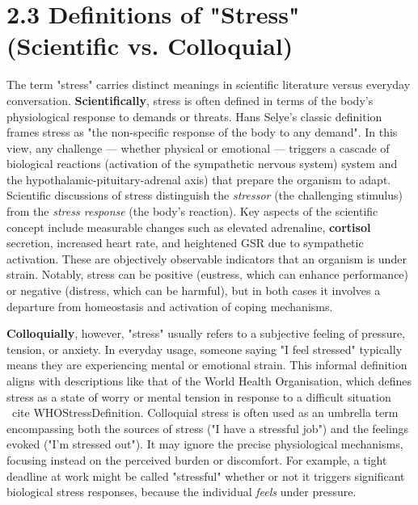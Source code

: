 \documentclass[11pt,a4paper]{report}
\begin{document}
\section{2.3 Definitions of "Stress" (Scientific vs. Colloquial)}

The term "stress" carries distinct meanings in scientific literature
versus everyday conversation. \textbf{Scientifically}, stress is often
defined in terms of the body's physiological response to demands or
threats. Hans Selye's classic definition frames stress as "the
non-specific response of the body to any
demand"\cite{StressDefinitionHH}.
In this view, any challenge --- whether physical or emotional --- triggers
a cascade of biological reactions (activation of the sympathetic nervous system)
system and the hypothalamic-pituitary-adrenal axis) that prepare the
organism to adapt. Scientific discussions of stress distinguish the
\textit{stressor} (the challenging stimulus) from the \textit{stress response} (the
body's reaction). Key aspects of the scientific concept include
measurable changes such as elevated adrenaline, \textbf{cortisol} secretion,
increased heart rate, and heightened GSR due to sympathetic
activation\cite{CortisolStressIndicator2020}.
These are objectively observable indicators that an organism is under
strain. Notably, stress can be positive (eustress, which can enhance
performance) or negative (distress, which can be harmful), but in both
cases it involves a departure from homeostasis and activation of coping
mechanisms.

\textbf{Colloquially}, however, "stress" usually refers to a subjective
feeling of pressure, tension, or anxiety. In everyday usage, someone
saying "I feel stressed" typically means they are experiencing mental or
emotional strain. This informal definition aligns with descriptions like
that of the World Health Organisation, which defines stress as a state
of worry or mental tension in response to a difficult
situation \ cite {WHOStressDefinition}.
Colloquial stress is often used as an umbrella term encompassing both
the sources of stress ("I have a stressful job") and the feelings evoked
("I'm stressed out"). It may ignore the precise physiological
mechanisms, focusing instead on the perceived burden or discomfort. For
example, a tight deadline at work might be called "stressful" whether or
not it triggers significant biological stress responses, because the
individual \textit{feels} under pressure.
\end{document}
